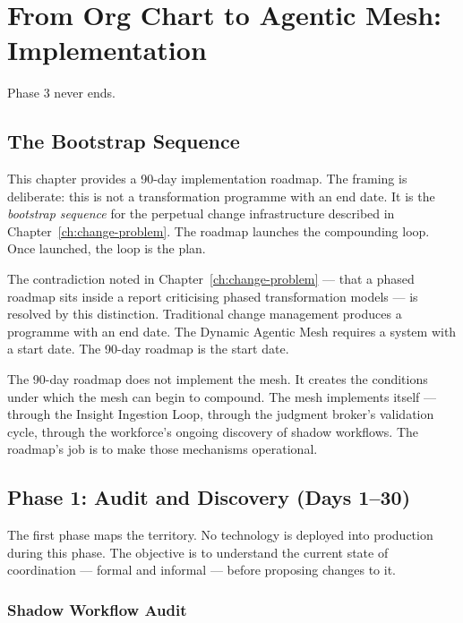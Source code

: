 \chapter{From Org Chart to Agentic Mesh: Implementation}
\label{ch:implementation}

\epigraph{Phase 3 never ends.}{}

\section{The Bootstrap Sequence}

This chapter provides a 90-day implementation roadmap. The framing is deliberate: this is not a transformation programme with an end date. It is the \emph{bootstrap sequence} for the perpetual change infrastructure described in Chapter~\ref{ch:change-problem}. The roadmap launches the compounding loop. Once launched, the loop is the plan.

The contradiction noted in Chapter~\ref{ch:change-problem} --- that a phased roadmap sits inside a report criticising phased transformation models --- is resolved by this distinction. Traditional change management produces a programme with an end date. The Dynamic Agentic Mesh requires a system with a start date. The 90-day roadmap is the start date.

\begin{keyinsight}
The 90-day roadmap does not implement the mesh. It creates the conditions under which the mesh can begin to compound. The mesh implements itself --- through the Insight Ingestion Loop, through the judgment broker's validation cycle, through the workforce's ongoing discovery of shadow workflows. The roadmap's job is to make those mechanisms operational.
\end{keyinsight}

\section{Phase 1: Audit and Discovery (Days 1--30)}

The first phase maps the territory. No technology is deployed into production during this phase. The objective is to understand the current state of coordination --- formal and informal --- before proposing changes to it.

\subsection{Shadow Workflow Audit}

